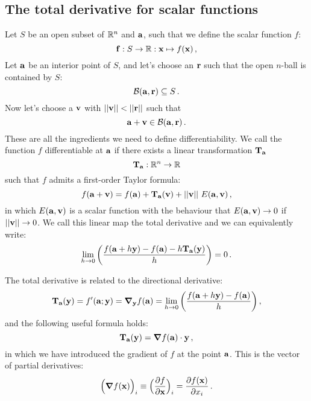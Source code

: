     \subsection{The total derivative for scalar functions}
        Let $S$ be an open subset of $\mathbb{R}^n$ and $\vb{a}$, such that we define the scalar function $f$:
        \begin{equation}
            \vb{f}: S \rightarrow \mathbb{R}: \vb{x} \mapsto f(\vb{x}) \thinspace ,
        \end{equation}
        Let $\vb{a}$ be an interior point of $S$, and let's choose an $\vb{r}$ such that the open $n$-ball is contained by $S$:
        \begin{equation}
            \mathcal{B}(\vb{a},\vb{r}) \subseteq S \thinspace .
        \end{equation}
        Now let's choose a $\vb{v}$ with $||\vb{v}|| < ||\vb{r}||$ such that
        \begin{equation}
            \vb{a} + \vb{v} \in \mathcal{B}(\vb{a},\vb{r}) \thinspace .
        \end{equation}
        These are all the ingredients we need to define differentiability. We call the function $f$ differentiable at $\vb{a}$ if there exists a linear transformation $\vb{T}_{\vb{a}}$
        \begin{equation}
            \vb{T}_{\vb{a}}: \mathbb{R}^n \to \mathbb{R}
        \end{equation}
        such that $f$ admits a first-order Taylor formula:
        \begin{equation}
            f(\vb{a} + \vb{v}) = f(\vb{a}) + \vb{T}_{\vb{a}}(\vb{v}) + ||\vb{v}|| E(\vb{a},\vb{\vb{v}}) \thinspace ,
        \end{equation}
        in which $E(\vb{a},\vb{\vb{v}})$ is a scalar function with the behaviour that $E(\vb{a},\vb{\vb{v}}) \to 0$ if $||\vb{v}|| \to 0$. We call this linear map the total derivative and we can equivalently write:
        \begin{equation}
            \lim_{h \to 0} \qty( \frac{f(\vb{a} + h \vb{y}) - f(\vb{a}) - h \vb{T}_{\vb{a}}(\vb{y})}{h} ) = 0 \thinspace .
        \end{equation}

        The total derivative is related to the directional derivative:
        \begin{equation}
            \vb{T}_{\vb{a}}(\vb{y}) = f'(\vb{a};\vb{y}) = \grad_{\vb{y}} f(\vb{a}) = \lim_{h \to 0} \qty( \frac{f(\vb{a} + h\vb{y}) - f(\vb{a})}{h} ) \thinspace ,
        \end{equation}
        and the following useful formula holds:
        \begin{equation}
            \vb{T}_{\vb{a}} (\vb{y}) = \grad{f(\vb{a})} \cdot \vb{y} \thinspace ,
        \end{equation}
        in which we have introduced the gradient of $f$ at the point $\vb{a}$. This is the vector of partial derivatives:
        \begin{equation}
            \Big( \grad{f(\vb{x})} \Big)_i \equiv \Big( \pdv{f}{\vb{x}} \Big)_i = \pdv{f(\vb{x})}{x_i} \thinspace .
        \end{equation}

